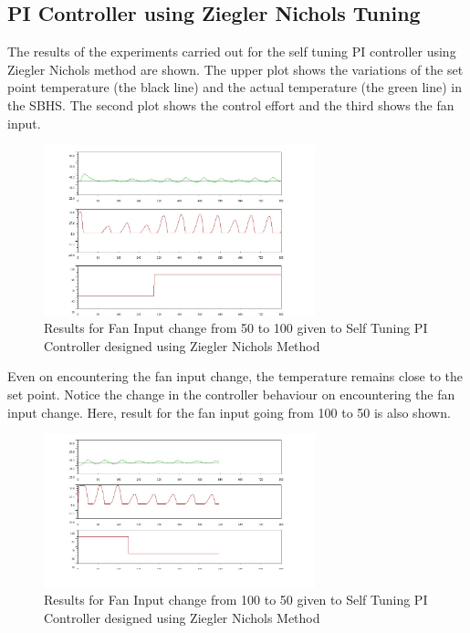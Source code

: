 \newpage
\subsection{PI Controller using Ziegler Nichols Tuning}
The results of the experiments carried out for the self tuning PI controller using Ziegler Nichols method are shown. The upper plot shows the variations of the set point temperature (the black line) and the actual temperature (the green line) in the SBHS. The second plot shows the control effort and the third shows the fan input.
\begin{figure}[h]
	\centering
\includegraphics[width=0.7\textwidth]{Vikas_self/report_tex/PID_results/self_tuning/FanDisturbance/PI/step50to100final.jpg}
	
\caption{Results for Fan Input change from 50 to 100 given to Self Tuning PI Controller designed using Ziegler Nichols Method}
\end{figure}

Even on encountering the fan input change, the temperature remains close to the set point. Notice the change in the controller behaviour on encountering the fan input change. 
\newpage
Here, result for the fan input going from 100 to 50 is also shown.
\begin{figure}[h]
	\centering
\includegraphics[width=0.7\textwidth]{Vikas_self/report_tex/PID_results/self_tuning/FanDisturbance/PI/step100to50.jpg}
	
\caption{Results for Fan Input change from 100 to 50 given to Self Tuning PI Controller designed using Ziegler Nichols Method}
\end{figure}

